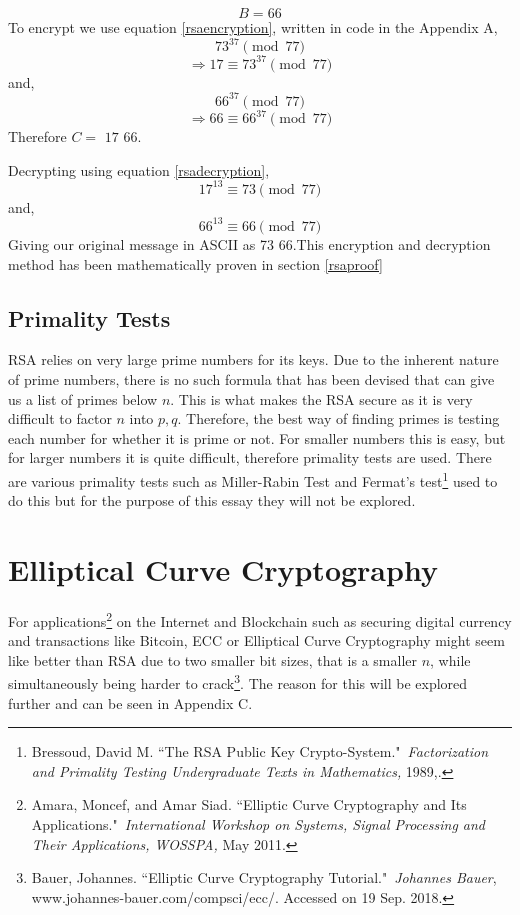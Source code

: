 \documentclass[a4paper,12pt]{article}
\theoremstyle{definition}
\begin{document}
\begin{equation*}
	B=66
\end{equation*}
To encrypt we use equation \ref{rsaencryption}, written in code in the Appendix A, 
\begin{equation*}
	73^{37} \pmod{77} 
\end{equation*}
\begin{equation*}
	\Rightarrow 17 \equiv 73^{37} \pmod{77} 
\end{equation*}
and,
\begin{equation*}
	66^{37} \pmod{77} 
\end{equation*}
\begin{equation*}
	\Rightarrow 66 \equiv 66^{37} \pmod{77} 
\end{equation*}
Therefore $C = $ $17$ $66$.

Decrypting using equation \ref{rsadecryption},
\begin{equation*}
	17^{13} \equiv 73 \pmod{77}
\end{equation*}
and,
\begin{equation*}
	66^{13} \equiv 66 \pmod{77}
\end{equation*}
Giving our original message in ASCII  as 73 66.This encryption and decryption method has been mathematically proven in section \ref{rsaproof}

\subsection{Primality Tests} \label{primalitytests}
RSA relies on very large prime numbers for its keys. Due to the inherent nature of prime numbers, there is no such formula that has been devised that can give us a list of primes below $n$. This is what makes the RSA secure as it is very difficult to factor $n$ into $p,q$. Therefore, the best way of finding primes is testing each number for whether it is prime or not. For smaller numbers this is easy, but for larger numbers it is quite difficult, therefore primality tests are used. There are various primality tests such as Miller-Rabin Test and Fermat's test\footnote{Bressoud, David M. ``The RSA Public Key Crypto-System." \textit{Factorization and Primality Testing Undergraduate Texts in Mathematics,} 1989,.} used to do this but for the purpose of this essay they will not be explored.


\newpage
\section{Elliptical Curve Cryptography}
For applications\footnote{Amara, Moncef, and Amar Siad. ``Elliptic Curve Cryptography and Its Applications." \textit{International Workshop on Systems, Signal Processing and Their Applications, WOSSPA,} May 2011.} on the Internet and Blockchain such as securing digital currency and transactions like Bitcoin, ECC or Elliptical Curve Cryptography might seem like better than RSA  due to two smaller bit sizes, that is a smaller $n$, while simultaneously being harder to crack\footnote{Bauer, Johannes. ``Elliptic Curve Cryptography Tutorial." \textit{Johannes Bauer}, www.johannes-bauer.com/compsci/ecc/. Accessed on 19 Sep. 2018.}. The reason for this will be explored further and can be seen in Appendix C.
\end{document}
